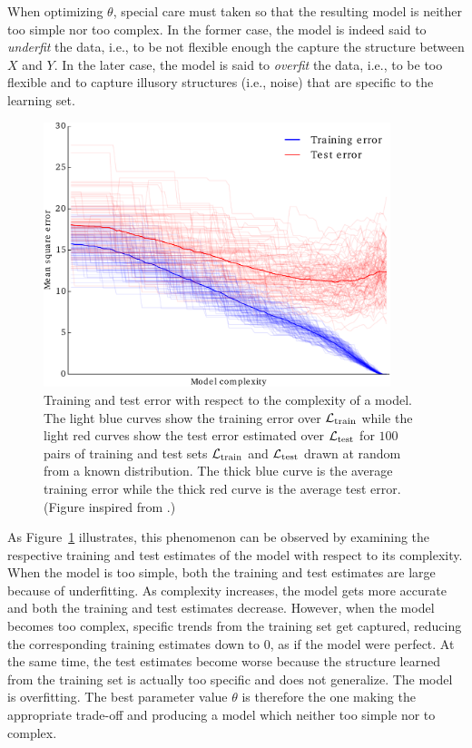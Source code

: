 When optimizing $\theta$, special care must taken so that the resulting model
is neither too simple nor too complex. In the former case, the model is indeed
said to \textit{underfit} the data, i.e., to be not flexible enough the capture
the structure between $X$ and $Y$. In the later case, the model is said to
\textit{overfit} the data, i.e., to be too flexible and to capture illusory
structures (i.e., noise) that are specific to the learning set.

\begin{figure}
    \centering
    \includegraphics[width=0.9\textwidth]{figures/ch2_train_test_error.pdf}
    \caption{Training and test error with respect to the complexity
             of a model. The light blue curves show the training error over
             ${\cal L}_\text{train}$ while the light red curves show the test
             error estimated over ${\cal L}_\text{test}$ for $100$ pairs of training
             and test sets ${\cal L}_\text{train}$ and ${\cal L}_\text{test}$
             drawn at random from a known distribution. The thick blue curve
             is the average training error while the thick red curve is the
             average test error. (Figure inspired from \citep{hastie:2005}.) }
    \label{fig:train-test-error}
\end{figure}

As Figure~\ref{fig:train-test-error}
illustrates, this phenomenon can be observed by examining the
respective training and test estimates of the model with respect to its
complexity. When the model is too simple, both the training and test estimates
are large because of underfitting. As complexity increases, the model gets more
accurate and both the training and test estimates decrease. However, when the
model becomes too complex, specific trends from the training set get captured,
reducing the corresponding training estimates down to $0$, as if the model were
perfect. At the same time, the test estimates become worse because the
structure learned from the training set is actually too specific and does not
generalize. The model is overfitting. The best parameter value $\theta$ is
therefore the one making the appropriate trade-off and producing a model which
neither too simple nor to complex.

